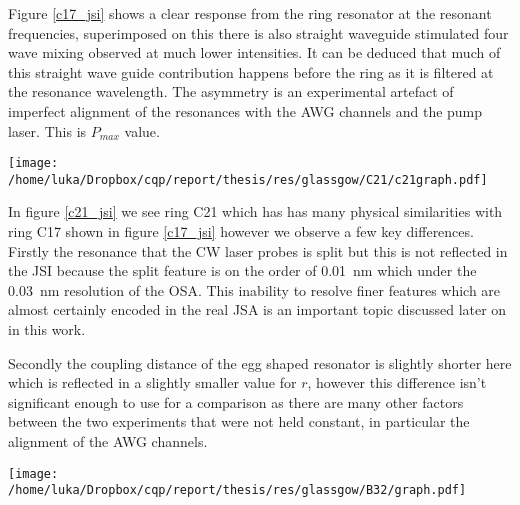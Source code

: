

Figure \ref{c17_jsi} shows a clear response from the ring resonator at the resonant frequencies, superimposed on this there is also straight waveguide stimulated four wave mixing observed at much lower intensities. It can be deduced that much of this straight wave guide contribution happens before the ring as it is filtered at the resonance wavelength.
The asymmetry is an experimental artefact of imperfect alignment of the resonances with the AWG channels and the pump laser. This is  $P_{max}$ value.

\begingroup
    \centering  
    \texttt{[image: /home/luka/Dropbox/cqp/report/thesis/res/glassgow/C21/c21graph.pdf]}
     \vspace{3pt} \label{c21_jsi}
\endgroup

In figure \ref{c21_jsi} we see ring C21 which has has many physical similarities with ring C17 shown in figure \ref{c17_jsi} however we observe a few key differences. Firstly the resonance that the CW laser probes is split but this is not reflected in the JSI because the split feature is on the order of \SI{0.01}{\nano\meter} which under the \SI{0.03}{\nano\meter} resolution of the OSA. This inability to resolve finer features which are almost certainly encoded in the real JSA is an important topic discussed later on in this work.

Secondly the coupling distance of the egg shaped resonator is slightly shorter here which is reflected in a slightly smaller value for $r$, however this difference isn't significant enough to use for a comparison as there are many other factors between the two experiments that were not held constant, in particular the alignment of the AWG channels.

\begingroup
    \centering  
    \texttt{[image: /home/luka/Dropbox/cqp/report/thesis/res/glassgow/B32/graph.pdf]}
     \vspace{3pt} \label{b32_jsi}
\endgroup

